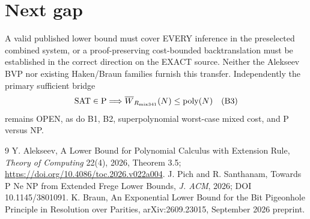 \documentclass[11pt]{article}
\begin{document}
\section*{Next gap}
A valid published lower bound must cover EVERY inference in the preselected combined system, or a proof-preserving cost-bounded backtranslation must be established in the correct direction on the EXACT source. Neither the Alekseev BVP nor existing Haken/Braun families furnish this transfer. Independently the primary sufficient bridge
\[
{\rm SAT}\in{\rm P}\Longrightarrow
\overline W_{R_{\rm mix341}}(N)\le{\rm poly}(N)
\quad(\mathrm{B3})
\]
remains OPEN, as do B1, B2, superpolynomial worst-case mixed cost, and P versus NP.
\begin{thebibliography}{9}
 Y. Alekseev, A Lower Bound for Polynomial Calculus with Extension Rule, \emph{Theory of Computing} 22(4), 2026, Theorem 3.5; \url{https://doi.org/10.4086/toc.2026.v022a004}.
 J. Pich and R. Santhanam, Towards P Ne NP from Extended Frege Lower Bounds, \emph{J. ACM}, 2026; DOI 10.1145/3801091.
 K. Braun, An Exponential Lower Bound for the Bit Pigeonhole Principle in Resolution over Parities, arXiv:2609.23015, September 2026 preprint.
\end{thebibliography}
\end{document}
